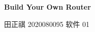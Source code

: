 \begin{center}
    \Large\textbf{Build Your Own Router}
    \vspace{1em}

    \normalsize 田正祺 \hspace{1em} 2020080095 \hspace{1em} 软件 01
\end{center}